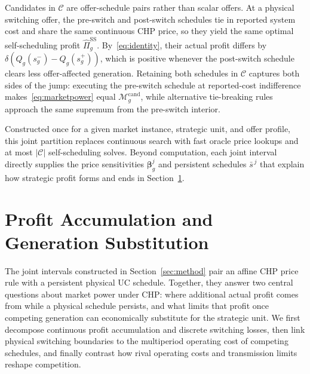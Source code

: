 \documentclass[journal]{IEEEtran}
\newcommand{\SSched}{\mathrm{SS}}
\begin{document}
Candidates in $\mathcal{C}$ are offer-schedule pairs rather than scalar offers. At a physical switching offer, the pre-switch and post-switch schedules tie in reported system cost and share the same continuous CHP price, so they yield the same optimal self-scheduling profit $\widehat{\Pi}_g^{\SSched}$. By~\eqref{eq:identity}, their actual profit differs by $\delta(Q_g(s_g^-)-Q_g(s_g^+))$, which is positive whenever the post-switch schedule clears less offer-affected generation. Retaining both schedules in $\mathcal{C}$ captures both sides of the jump: executing the pre-switch schedule at reported-cost indifference makes~\eqref{eq:marketpower} equal $\mathcal{M}_g^{\mathrm{cand}}$, while alternative tie-breaking rules approach the same supremum from the pre-switch interior.

Constructed once for a given market instance, strategic unit, and offer profile, this joint partition replaces continuous search with fast oracle price lookups and at most $|\mathcal{C}|$ self-scheduling solves. Beyond computation, each joint interval directly supplies the price sensitivities $\bm{\beta}_g^j$ and persistent schedules $\bar{s}^{\,j}$ that explain how strategic profit forms and ends in Section~\ref{sec:mechanism}.

\section{Profit Accumulation and Generation Substitution}
\label{sec:mechanism}
The joint intervals constructed in Section~\ref{sec:method} pair an affine CHP price rule with a persistent physical UC schedule. Together, they answer two central questions about market power under CHP: where additional actual profit comes from while a physical schedule persists, and what limits that profit once competing generation can economically substitute for the strategic unit. We first decompose continuous profit accumulation and discrete switching losses, then link physical switching boundaries to the multiperiod operating cost of competing schedules, and finally contrast how rival operating costs and transmission limits reshape competition.

\end{document}
